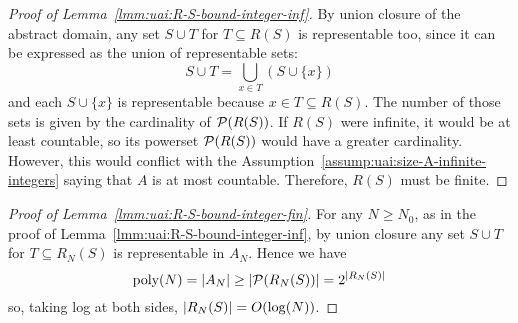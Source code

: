 \begin{proof}[Proof of Lemma~\ref{lmm:uai:R-S-bound-integer-inf}]
	By union closure of the abstract domain, any set $S \cup T$ for $T \subseteq R(S)$ is representable too, since it can be expressed as the union of representable sets:
	\begin{equation*}
		S \cup T = \bigcup\limits_{x \in T} (S \cup \{ x \})
	\end{equation*}
	and each $S \cup \{ x \}$ is representable because $x \in T \subseteq R(S)$.
	The number of those sets is given by the cardinality of $\mathcal{P}(R(S))$. If $R(S)$ were infinite, it would be at least countable, so its powerset $\mathcal{P}(R(S))$ would have a greater cardinality. However, this would conflict with the Assumption~\ref{assump:uai:size-A-infinite-integers} saying that $A$ is at most countable. Therefore, $R(S)$ must be finite.
\end{proof}
\begin{proof}[Proof of Lemma~\ref{lmm:uai:R-S-bound-integer-fin}]
	For any $N \ge N_0$, as in the proof of Lemma~\ref{lmm:uai:R-S-bound-integer-inf}, by union closure any set $S \cup T$ for $T \subseteq R_{N}(S)$ is representable in $A_N$. Hence we have
	\begin{equation*}
		\text{poly}(N) = \lvert A_N\rvert \ge \lvert\mathcal{P}(R_{N}(S))\rvert = 2^{\lvert R_{N}(S)\rvert}
	\end{equation*}
	so, taking log at both sides, $\lvert R_{N}(S)\rvert = O(\log(N))$.
\end{proof}

